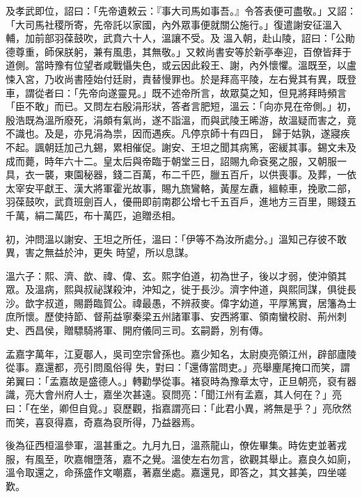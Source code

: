 \begin{pinyinscope}
 及孝武即位，詔曰：「先帝遺敕云：『事大司馬如事吾。』令答表便可盡敬。」又詔：「大司馬社稷所寄，先帝託以家國，內外眾事便就關公施行。」復遣謝安征溫入輔，加前部羽葆鼓吹，武賁六十人，溫讓不受。及
 溫入朝，赴山陵，詔曰：「公勛德尊重，師保朕躬，兼有風患，其無敬。」又敕尚書安等於新亭奉迎，百僚皆拜于道側。當時豫有位望者咸戰懾失色，或云因此殺王、謝，內外懷懼。溫既至，以盧悚入宮，乃收尚書陸始付廷尉，責替慢罪也。於是拜高平陵，左右覺其有異，既登車，謂從者曰：「先帝向遂靈見。」既不述帝所言，故眾莫之知，但見將拜時頻言「臣不敢」而已。又問左右殷涓形狀，答者言肥短，溫云：「向亦見在帝側。」初，殷浩既為溫所廢死，涓頗有氣尚，遂不詣溫，而與武陵王晞游，故溫疑而害之，竟不識也。及是，亦見涓為祟，因而遇疾。凡停京師十有四日，
 歸于姑孰，遂寢疾不起。諷朝廷加己九錫，累相催促。謝安、王坦之聞其病篤，密緩其事。錫文未及成而薨，時年六十二。皇太后與帝臨于朝堂三日，詔賜九命袞冕之服，又朝服一具，衣一襲，東園秘器，錢二百萬，布二千匹，臘五百斤，以供喪事。及葬，一依太宰安平獻王、漢大將軍霍光故事，賜九旒鸞輅，黃屋左纛，縕輬車，挽歌二部，羽葆鼓吹，武賁班劍百人，優冊即前南郡公增七千五百戶，進地方三百里，賜錢五千萬，絹二萬匹，布十萬匹，追贈丞相。



 初，沖問溫以謝安、王坦之所任，溫曰：「伊等不為汝所處分。」溫知己存彼不敢異，害之無益於沖，更失
 時望，所以息謀。



 溫六子：熙、濟、歆、禕、偉、玄。熙字伯道，初為世子，後以才弱，使沖領其眾。及溫病，熙與叔祕謀殺沖，沖知之，徙于長沙。濟字仲道，與熙同謀，俱徙長沙。歆字叔道，賜爵臨賀公。禕最愚，不辨菽麥。偉字幼道，平厚篤實，居籓為士庶所懷。歷使持節、督荊益寧秦梁五州諸軍事、安西將軍、領南蠻校尉、荊州刺史、西昌侯，贈驃騎將軍、開府儀同三司。玄嗣爵，別有傳。



 孟嘉字萬年，江夏鄳人，吳司空宗曾孫也。嘉少知名，太尉庾亮領江州，辟部廬陵從事。嘉還都，亮引問風俗得
 失，對曰：「還傳當問吏。」亮舉麈尾掩口而笑，謂弟翼曰：「孟嘉故是盛德人。」轉勸學從事。褚裒時為豫章太守，正旦朝亮，裒有器識，亮大會州府人士，嘉坐次甚遠。裒問亮：「聞江州有孟嘉，其人何在？」亮曰：「在坐，卿但自覓。」裒歷觀，指嘉謂亮曰：「此君小異，將無是乎？」亮欣然而笑，喜裒得嘉，奇嘉為裒所得，乃益器焉。



 後為征西桓溫參軍，溫甚重之。九月九日，溫燕龍山，僚佐畢集。時佐吏並著戎服，有風至，吹嘉帽墮落，嘉不之覺。溫使左右勿言，欲觀其舉止。嘉良久如廁，溫令取還之，命孫盛作文嘲嘉，著嘉坐處。嘉還見，即答之，其文甚美，四坐嗟歎。




\end{pinyinscope}
